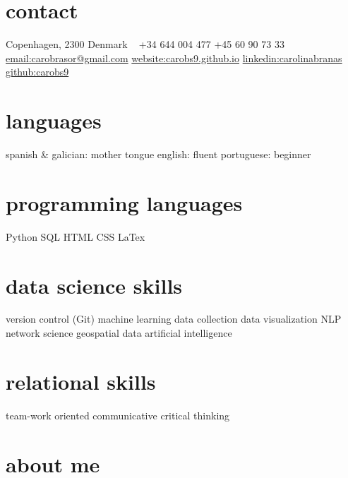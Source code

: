 \documentclass[]{friggeri-cv-a4}
\begin{document}


\begin{aside} %
\section{contact}
Copenhagen,
2300
Denmark
~
+34 644 004 477
+45 60 90 73 33
~
\href{mailto:carobrasor@gmail.com}{email:carobrasor@gmail.com}
\href{https://carobs9.github.io/}{website:carobs9.github.io}
\href{https://www.linkedin.com/in/carolinabranas/}{linkedin:carolinabranas}
\href{https://github.com/carobs9}{github:carobs9}
\section{languages}
spanish \& galician: mother tongue
english: fluent
portuguese: beginner
\section{programming languages}
Python
SQL
HTML
CSS
LaTex
\section{data science skills}
version control (Git)
machine learning
data collection
data visualization
NLP
network science
geospatial data
artificial intelligence
\section{relational skills}
team-work oriented
communicative
critical thinking
\end{aside}


\section{about me}

\renewcommand{\section}[1]{
  \par\vspace{\parskip}
  \noindent
  \textcolor{purple}{\rule{3pt}{18pt}} \hspace{0.5em}
  {\LARGE\headingfont\color{headercolor}\textsc{#1}}\par\vspace{\parskip}
}
\end{document}
